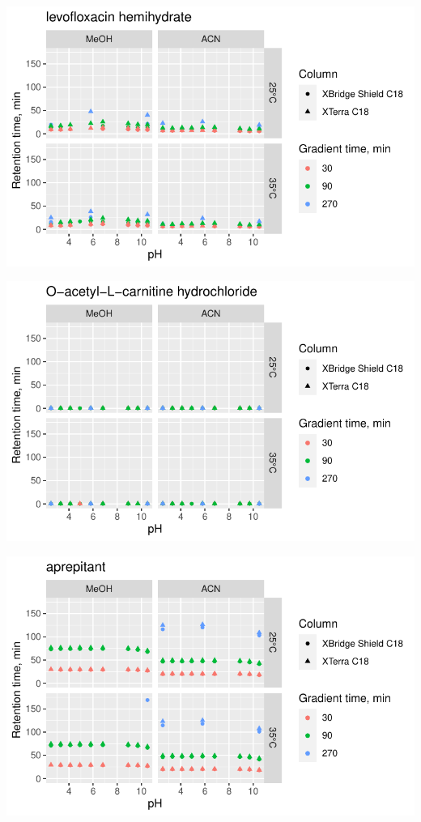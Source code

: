 \documentclass[
  letterpaper,
  DIV=11,
  numbers=noendperiod]{scrreprt}
\begin{document}
\includegraphics{index_files/figure-pdf/unnamed-chunk-4-174.pdf}

\includegraphics{index_files/figure-pdf/unnamed-chunk-4-175.pdf}

\includegraphics{index_files/figure-pdf/unnamed-chunk-4-176.pdf}
\end{document}
